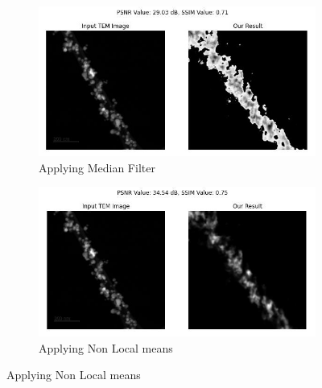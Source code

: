 \begin{figure}[H]
    \vspace{15pt} %
    
    \begin{subfigure}{.47\textwidth} %
        \includegraphics[width=\textwidth]{img/Results/Dataset_2/Dataset_2_median_filter.jpg}
        \caption{Applying Median Filter}
        \label{fig:Image3}
    \end{subfigure}
    \hfill
    \begin{subfigure}{.47\textwidth} %
        \includegraphics[width=\textwidth]{img/Results/Dataset_2/Dataset_2_non_local_means.jpg}
        \caption{Applying Non Local means}
        \label{fig:Image4}
    \end{subfigure}
    
    \vspace{15pt} %
    

\end{figure}
